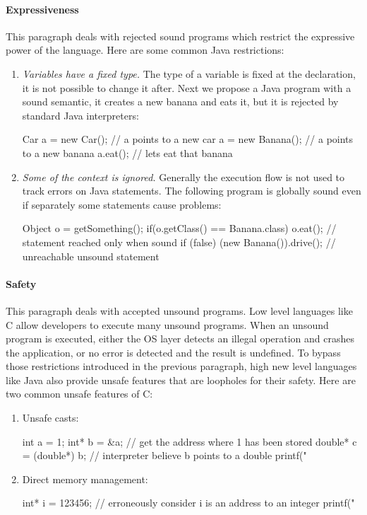 \documentclass[a4paper]{report}
\begin{document}
\paragraph{Expressiveness} This paragraph deals with rejected sound programs which restrict the expressive power of the language. Here are some common Java restrictions:
\begin{enumerate}
\item \emph{Variables have a fixed type.} The type of a variable is fixed at the declaration, it is not possible to change it after. Next we propose a Java program with a sound semantic, it creates a new banana and eats it, but it is rejected by standard Java interpreters:
\begin{java}
Car a = new Car(); // a points to a new car
a = new Banana();  // a points to a new banana
a.eat();           // lets eat that banana
\end{java}
\item \emph{Some of the context is ignored.} Generally the execution flow is not used to track errors on Java statements. The following program is globally sound even if separately some statements cause problems:
\begin{java}
Object o = getSomething();
if(o.getClass() == Banana.class) {
	o.eat();                       // statement reached only when sound
}
if (false) {
	(new Banana()).drive();        // unreachable unsound statement
}
\end{java}
\end{enumerate}

\paragraph{Safety} This paragraph deals with accepted unsound programs. Low level languages like C allow developers to execute many unsound programs. When an unsound program is executed, either the OS layer detects an illegal operation and crashes the application, or no error is detected and the result is undefined. To bypass those restrictions introduced in the previous paragraph, high new level languages like Java also provide unsafe features that are loopholes for their safety. Here are two common unsafe features of C:
\begin{enumerate}
\item Unsafe casts:
\begin{cansi}
int a = 1;
int* b = &a;             // get the address where 1 has been stored
double* c = (double*) b; // interpreter believe b points to a double
printf("%
\end{cansi}
\item Direct memory management:
\begin{cansi}
int* i = 123456; // erroneously consider i is an address to an integer
printf("%
\end{cansi}
\end{enumerate}
\end{document}
